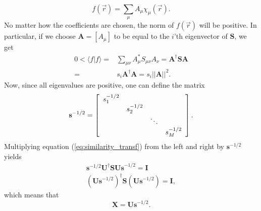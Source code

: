 \begin{equation}
 f(\vec r) = \sum_\mu A_\mu\chi_\mu(\vec r).
\end{equation}
No matter how the coefficients are chosen, the norm of $f(\vec r)$ will be positive. In particular, if we choose $\mathbf{A}=[A_\mu]$ to be equal to the $i$'th eigenvector of $\mathbf S$, we get
\begin{equation}
\begin{split}
 0 < \langle f|f\rangle = & \sum_{\mu\nu}A^*_\mu S_{\mu\nu} A_\nu = \mathbf{A^\dagger S A} \\
                    = & s_i\mathbf{A^\dagger A} =  s_i ||\mathbf A||^2.
\end{split}                  
\end{equation}
Now, since all eigenvalues are positive, one can define the matrix
\begin{equation}
 \mathbf s^{-1/2} = \left[\begin{array}{c c c c}
                          s_1^{-1/2} &&& \\
                          & s_2^{-1/2} && \\
                          && \ddots & \\
                          &&& s_M^{-1/2} 
                         \end{array}\right].
\end{equation}
Multiplying equation (\ref{eq:similarity_transf}) from the left and right by $\mathbf s^{-1/2}$ yields
\begin{equation}
\begin{split}
 \mathbf s^{-1/2} \mathbf U^\dagger \mathbf{S U s}^{-1/2} =  \mathbf I \\
 (\mathbf{Us}^{-1/2})^\dagger \mathbf S (\mathbf{Us}^{-1/2}) =  \mathbf I,
\end{split}
\end{equation}
which means that
\begin{equation}
 \mathbf X = \mathbf{Us}^{-1/2}.
\end{equation}